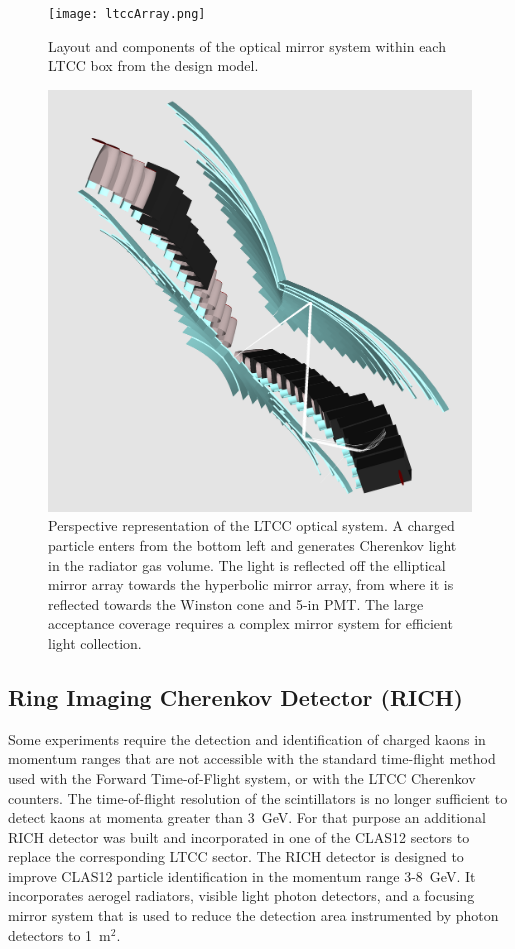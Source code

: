 \documentclass[final,3p,twocolumn]{elsarticle}
\begin{document}
\begin{figure}[htbp!]
\centerline{\texttt{[image: ltccArray.png]}}
\caption{Layout and components of the optical mirror system within each LTCC box from the design model.}
\label{ltcc1}
\end{figure}
\begin{figure}[htbp!]
\centerline{\includegraphics[width=0.95\columnwidth]{ltcc-mod6.png}}
\caption{Perspective representation of the LTCC optical system. A charged particle enters from the bottom left
  and generates Cherenkov light in the radiator gas volume. The light is reflected off the elliptical mirror array
  towards the hyperbolic mirror array, from where it is reflected towards the Winston cone and 5-in PMT. The
  large acceptance coverage requires a complex mirror system for efficient light collection.}
\label{ltcc2}
\end{figure}

\subsection{Ring Imaging Cherenkov Detector (RICH)} 

Some experiments require the detection and identification of charged kaons in momentum ranges that are not 
accessible with the standard time-flight method used with the Forward Time-of-Flight system, or with the LTCC
Cherenkov counters. The time-of-flight resolution of the scintillators is no longer sufficient to detect kaons at
momenta greater than 3~GeV. For that purpose an additional RICH detector was built and incorporated in one of
the CLAS12 sectors to replace the corresponding LTCC sector. The RICH detector is designed to improve CLAS12
particle identification in the momentum range 3-8~GeV. It incorporates aerogel radiators, visible light photon
detectors, and a focusing mirror system that is used to reduce the detection area instrumented by photon detectors
to 1~m$^2$.
\end{document}
